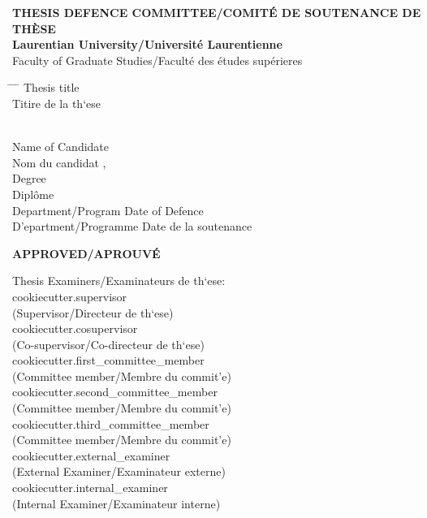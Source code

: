 \begin{center}
    \textbf{THESIS DEFENCE COMMITTEE/COMIT\'E DE SOUTENANCE DE TH\`ESE} \\
    \textbf{Laurentian University/Universit\'e Laurentienne} \\
    Faculty of Graduate Studies/Facult\'e des \'etudes sup\'erieres
\end{center}
\footnotesize
\begin{tabbing}
    \hspace{0.25\textwidth} \= \hspace{0.33\textwidth} \= \hspace{0.22\textwidth} \= \hspace{0.2\textwidth} \kill
    Thesis title \\
    Titire de la th\a`ese \> \begin{minipage}[t]{0.75\textwidth} \thetitle \end{minipage} \\[1.0em]
    Name of Candidate \\
    Nom du candidat \> \surname , \givenname \\[1.0em]
    Degree \\
    Dipl\^ome \> \programdegree \\[1.0em]
    Department/Program \> \> Date of Defence \\
    D\a'epartment/Programme \> \program \> Date de la soutenance \> \dateofdefence
\end{tabbing}
\vspace{-2.0\parskip}
\begin{center}
    \textbf{APPROVED/APROUV\'E} \\
\end{center}
\vspace{-1.5\parskip}
\begin{minipage}[c]{0.5\textwidth}
    Thesis Examiners/Examinateurs de th\a`ese: \\[1.00em]
    {{cookiecutter.supervisor}} \\
    (Supervisor/Directeur de th\a`ese) \\[0.5em]
    {{cookiecutter.cosupervisor}} \\
    (Co-supervisor/Co-directeur de th\a`ese) \\[0.5em]
    {{cookiecutter.first_committee_member}} \\
    (Committee member/Membre du commit\a'e) \\[1.00em]
    {{cookiecutter.second_committee_member}} \\
    (Committee member/Membre du commit\a'e) \\[1.00em]
    {{cookiecutter.third_committee_member}} \\
    (Committee member/Membre du commit\a'e) \\[1.00em]
    {{cookiecutter.external_examiner}} \\
    (External Examiner/Examinateur externe) \\[1.00em]
    {{cookiecutter.internal_examiner}} \\
    (Internal Examiner/Examinateur interne) \\
\end{minipage}
